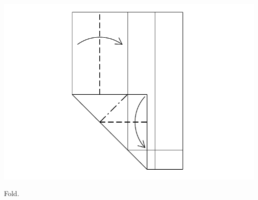 \documentclass[11pt]{article}
\begin{document}
\begin{minipage}[t]{0.3\textwidth}
  \includegraphics[width=\textwidth]{../figs/fig04-06}
  \begin{itemize}{\item[6.] Fold.}\end{itemize}
\end{minipage}

\vspace*{0.5in}
\end{document}
